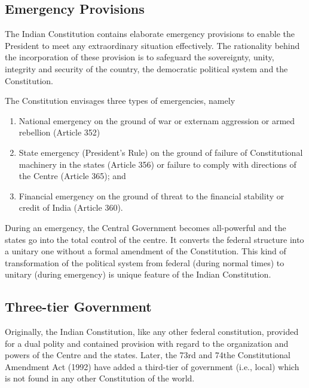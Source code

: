 \subsection{Emergency Provisions}

The Indian Constitution contains elaborate emergency provisions to enable the President to meet any extraordinary situation effectively. The rationality behind the incorporation of these provision is to safeguard the sovereignty, unity, integrity and security of the country, the democratic political system and the Constitution.

The Constitution envisages three types of emergencies, namely

\renewcommand{\labelenumi}{\textbf{(\alph{enumi})}}
\begin{enumerate}
  \item National emergency on the ground of war or externam aggression or armed rebellion (Article 352)
  \item State emergency (President's Rule) on the ground of failure of Constitutional machinery in the states (Article 356) or failure to comply with directions of the Centre (Article 365); and
  \item Financial emergency on the ground of threat to the financial stability or credit of India (Article 360).
\end{enumerate}

During an emergency, the Central Government becomes all-powerful and the states go into the total control of the centre. It converts the federal structure into a unitary one without a formal amendment of the Constitution. This kind of transformation of the political system from federal (during normal times) to unitary (during emergency) is unique feature of the Indian Constitution.

\subsection{Three-tier Government}

Originally, the Indian Constitution, like any other federal constitution, provided for a dual polity and contained provision with regard to the organization and powers of the Centre and the states. Later, the 73rd and 74the Constitutional Amendment Act (1992) have added a third-tier of government (i.e., local) which is not found in any other Constitution of the world.

